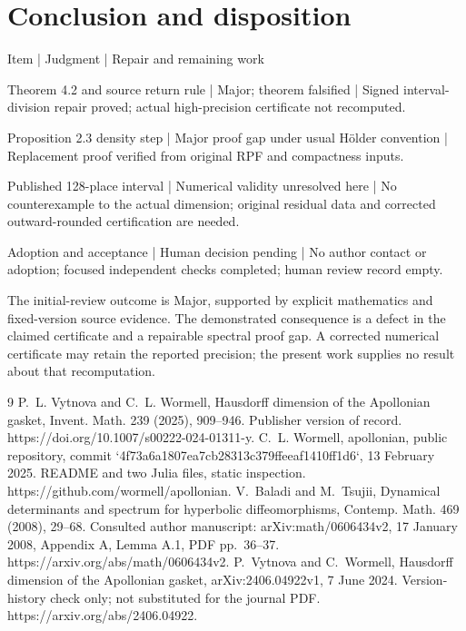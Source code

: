\documentclass[10pt]{article}
\begin{document}
\section*{Conclusion and disposition}
Item | Judgment | Repair and remaining work\par
Theorem 4.2 and source return rule | Major; theorem falsified | Signed interval-division repair proved; actual high-precision certificate not recomputed.\par
Proposition 2.3 density step | Major proof gap under usual Hölder convention | Replacement proof verified from original RPF and compactness inputs.\par
Published 128-place interval | Numerical validity unresolved here | No counterexample to the actual dimension; original residual data and corrected outward-rounded certification are needed.\par
Adoption and acceptance | Human decision pending | No author contact or adoption; focused independent checks completed; human review record empty.\par
The initial-review outcome is Major, supported by explicit mathematics and fixed-version source evidence. The demonstrated consequence is a defect in the claimed certificate and a repairable spectral proof gap. A corrected numerical certificate may retain the reported precision; the present work supplies no result about that recomputation.\par
9 P. L. Vytnova and C. L. Wormell, Hausdorff dimension of the Apollonian gasket, Invent. Math. 239 (2025), 909–946. Publisher version of record. https://doi.org/10.1007/s00222-024-01311-y. C. L. Wormell, apollonian, public repository, commit `4f73a6a1807ea7cb28313c379ffeeaf1410ff1d6`, 13 February 2025. README and two Julia files, static inspection. https://github.com/wormell/apollonian. V. Baladi and M. Tsujii, Dynamical determinants and spectrum for hyperbolic diffeomorphisms, Contemp. Math. 469 (2008), 29–68. Consulted author manuscript: arXiv:math/0606434v2, 17 January 2008, Appendix A, Lemma A.1, PDF pp. 36–37. https://arxiv.org/abs/math/0606434v2. P. Vytnova and C. Wormell, Hausdorff dimension of the Apollonian gasket, arXiv:2406.04922v1, 7 June 2024. Version-history check only; not substituted for the journal PDF. https://arxiv.org/abs/2406.04922.\par
\end{document}
